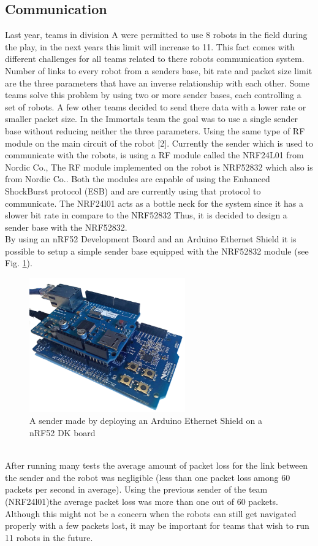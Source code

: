 \subsection{Communication}
Last year, teams in division A were permitted to use 8 robots in the field during the play, in the next years this limit will increase to 11. This fact comes with different challenges for all teams related to there robots communication system.\\
\indent Number of links to every robot from a senders base, bit rate and packet size limit are the three parameters that have an inverse relationship with each other. Some teams solve this problem by using two or more sender bases, each controlling a set of robots. A few other teams decided to send there data with a lower rate or smaller packet size. In the Immortals team the goal was to use a single sender base without reducing neither the three parameters. Using the same type of RF module on the main circuit of the robot [2]. Currently the sender which is used to communicate with the robots, is using a RF module called the NRF24L01 from Nordic Co., The RF module implemented on the robot is NRF52832 which also is from Nordic Co.. Both the modules are capable of using the Enhanced ShockBurst protocol (ESB) and are currently using that protocol to communicate. The NRF24l01 acts as a bottle neck for the system since it has a slower bit rate in compare to the NRF52832 Thus, it is decided to design a sender base with the NRF52832.\\
\indent By using an nRF52 Development Board and an Arduino Ethernet Shield it is possible to setup a simple sender base equipped with the NRF52832 module (see Fig. \ref{fig:SIMPLE_SENDER}).\\
\begin{figure}
	\centering
	\includegraphics[width=0.6\textwidth]{images/NRF52832DK_ETH.png}
	\caption{A sender made by deploying an Arduino Ethernet Shield on a nRF52 DK board}
	\label{fig:SIMPLE_SENDER}
\end{figure}\\
\indent After running many tests the average amount of packet loss for the link between the sender and the robot was negligible (less than one packet loss among 60 packets per second in average). Using the previous sender of the team (NRF24l01)the average packet loss was more than one out of 60 packets. Although this might not be a concern when the robots can still get navigated properly with a few packets lost, it may be important for teams that wish to run 11 robots in the future.\\

